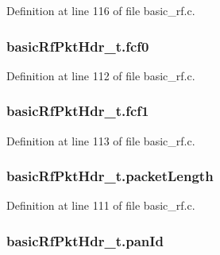 Definition at line 116 of file basic\_\-rf.c.

\hypertarget{structbasic_rf_pkt_hdr__t_a7876c1730d2584da13b6ab4f71a00f1c}{
\subsubsection[{fcf0}]{ {\bf basicRfPktHdr\_\-t.fcf0}}}
\label{structbasic_rf_pkt_hdr__t_a7876c1730d2584da13b6ab4f71a00f1c}


Definition at line 112 of file basic\_\-rf.c.

\hypertarget{structbasic_rf_pkt_hdr__t_abab1c726e43546c3d12ae520e0953c66}{
\subsubsection[{fcf1}]{ {\bf basicRfPktHdr\_\-t.fcf1}}}
\label{structbasic_rf_pkt_hdr__t_abab1c726e43546c3d12ae520e0953c66}


Definition at line 113 of file basic\_\-rf.c.

\hypertarget{structbasic_rf_pkt_hdr__t_a26b8a73b347a2110cfb1bab0bef83f69}{
\subsubsection[{packetLength}]{ {\bf basicRfPktHdr\_\-t.packetLength}}}
\label{structbasic_rf_pkt_hdr__t_a26b8a73b347a2110cfb1bab0bef83f69}


Definition at line 111 of file basic\_\-rf.c.

\hypertarget{structbasic_rf_pkt_hdr__t_ac914da221dbe703a3a96204563232a7a}{
\subsubsection[{panId}]{ {\bf basicRfPktHdr\_\-t.panId}}}
\label{structbasic_rf_pkt_hdr__t_ac914da221dbe703a3a96204563232a7a}


